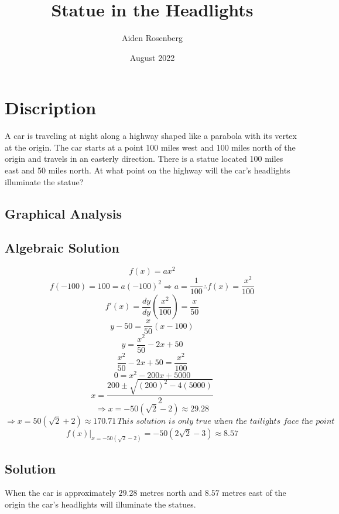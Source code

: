 \documentclass[11pt,letterpaper]{article}
\title{Statue in the Headlights}
\author{Aiden Rosenberg}
\date{August 2022}
\begin{document}
\maketitle
\section{Discription}
A car is traveling at night along a highway shaped like a parabola with its vertex at the origin. The car starts at a point 100 miles west and 100 miles north of the origin and travels in an easterly direction. There is a statue located 100 miles east and 50 miles north. At what point on the highway will the car's headlights illuminate the statue? 

\subsection{Graphical Analysis}
\begin{center}
\end{center}
\newpage

\subsection{Algebraic Solution}

$$f(x)=ax^2$$
$$f(-100)=100=a(-100)^2\Longrightarrow a=\frac{1}{100} \therefore f(x)=\frac{x^2}{100}$$
$$f'(x)=\frac{dy}{dy}(\frac{x^2}{100})=\frac{x}{50} $$ 
$$y-50=\frac{x}{50}(x-100)$$ 
$$y=\frac{x^2}{50}-2x+50$$
$$\frac{x^2}{50}-2x+50=\frac{x^2}{100}$$
$$0=x^2-200x+5000$$
$$x=\frac{200\pm\sqrt{(200)^2-4(5000)}}{2}$$
$$\Longrightarrow x= -50(\sqrt{2}-2) \approx 29.28 $$
$$\Longrightarrow x= 50(\sqrt{2}+2) \approx 170.71 \, \textit{This solution is only true when the tailights face the point}$$ 
$$f(x)\bigg\rvert_{x=-50(\sqrt{2}-2)}=-50(2\sqrt{2}-3) \approx 8.57$$

\subsection{Solution}
When the car is approximately $29.28$ metres north and $8.57$ metres east of the origin the car's headlights will illuminate the statues.
\end{document}
